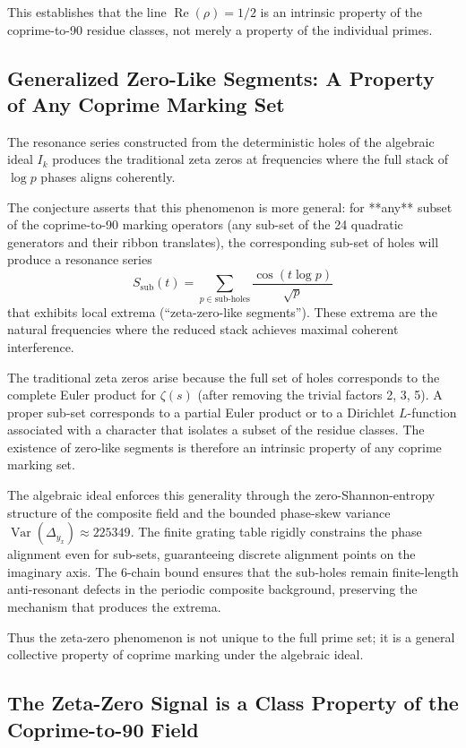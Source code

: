 \documentclass[11pt,a4paper]{article}
\begin{document}
This establishes that the line \(\operatorname{Re}(\rho)=1/2\) is an intrinsic property of the coprime-to-90 residue classes, not merely a property of the individual primes.

\subsection{Generalized Zero-Like Segments: A Property of Any Coprime Marking Set}

The resonance series constructed from the deterministic holes of the algebraic ideal \(I_k\) produces the traditional zeta zeros at frequencies where the full stack of \(\log p\) phases aligns coherently.

The conjecture asserts that this phenomenon is more general: for **any** subset of the coprime-to-90 marking operators (any sub-set of the 24 quadratic generators and their ribbon translates), the corresponding sub-set of holes will produce a resonance series
\[
S_{\text{sub}}(t)=\sum_{p\in\text{sub-holes}}\frac{\cos(t\log p)}{\sqrt{p}}
\]
that exhibits local extrema (“zeta-zero-like segments”). These extrema are the natural frequencies where the reduced stack achieves maximal coherent interference.

The traditional zeta zeros arise because the full set of holes corresponds to the complete Euler product for \(\zeta(s)\) (after removing the trivial factors 2, 3, 5). A proper sub-set corresponds to a partial Euler product or to a Dirichlet \(L\)-function associated with a character that isolates a subset of the residue classes. The existence of zero-like segments is therefore an intrinsic property of any coprime marking set.

The algebraic ideal enforces this generality through the zero-Shannon-entropy structure of the composite field and the bounded phase-skew variance \(\operatorname{Var}(\Delta_{y_x})\approx225349\). The finite grating table rigidly constrains the phase alignment even for sub-sets, guaranteeing discrete alignment points on the imaginary axis. The 6-chain bound ensures that the sub-holes remain finite-length anti-resonant defects in the periodic composite background, preserving the mechanism that produces the extrema.

Thus the zeta-zero phenomenon is not unique to the full prime set; it is a general collective property of coprime marking under the algebraic ideal.

\subsection{The Zeta-Zero Signal is a Class Property of the Coprime-to-90 Field}
\end{document}
